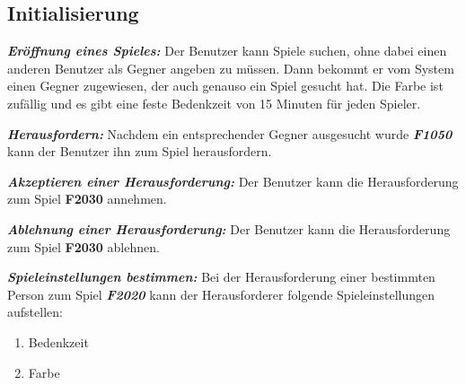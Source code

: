 \documentclass[parskip=full]{scrartcl}
\begin{document}
\subsection{Initialisierung}
\begin{description}
	\hypertarget{F2010}{\item[F2010]}\textbf{\textit{Eröffnung 	eines Spieles: }} Der Benutzer kann Spiele suchen, ohne dabei einen anderen Benutzer als Gegner angeben zu müssen. Dann bekommt er vom System einen Gegner zugewiesen, der auch genauso ein Spiel gesucht hat. Die Farbe ist zufällig und es gibt eine feste \gls{Bedenkzeit} von 15 Minuten für jeden Spieler.
	
	\item[F2020] \textbf{\textit{Herausfordern: }} Nachdem ein entsprechender Gegner ausgesucht wurde \textbf{\textit{F1050}} kann der Benutzer ihn zum Spiel herausfordern.
	\item [F2030] \textbf{\textit{Akzeptieren einer Herausforderung: }} Der Benutzer kann die Herausforderung zum Spiel \textbf{F2030} annehmen.
	\item [F2040] \textbf{\textit{Ablehnung einer Herausforderung: }} Der Benutzer kann die Herausforderung zum Spiel \textbf{F2030} ablehnen.
	
	\item[F2050] \textbf{\textit{Spieleinstellungen bestimmen: }} Bei der Herausforderung einer bestimmten Person zum Spiel \textbf{\textit{F2020}} kann der Herausforderer folgende
	Spieleinstellungen aufstellen:
	\begin{enumerate}
		\item \gls{Bedenkzeit}
		\item Farbe
	\end{enumerate}
	
	
	
\end{description}
\end{document}
